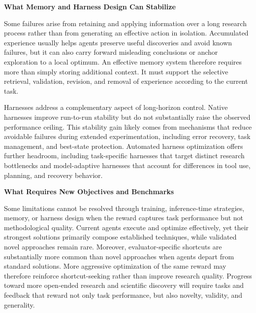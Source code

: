 \textbf{What Memory and Harness Design Can Stabilize}

Some failures arise from retaining and applying information over a long research process rather than from generating an effective action in isolation.
Accumulated experience usually helps agents preserve useful discoveries and avoid known failures, but it can also carry forward misleading conclusions or anchor exploration to a local optimum.
An effective memory system therefore requires more than simply storing additional context. It must support the selective retrieval, validation, revision, and removal of experience according to the current task.

Harnesses address a complementary aspect of long-horizon control.
Native harnesses improve run-to-run stability but do not substantially raise the observed performance ceiling.
This stability gain likely comes from mechanisms that reduce avoidable failures during extended experimentation, including error recovery, task management, and best-state protection.
Automated harness optimization offers further headroom, including task-specific harnesses that target distinct research bottlenecks and model-adaptive harnesses that account for differences in tool use, planning, and recovery behavior.

\textbf{What Requires New Objectives and Benchmarks}

Some limitations cannot be resolved through training, inference-time strategies, memory, or harness design when the reward captures task performance but not methodological quality.
Current agents execute and optimize effectively, yet their strongest solutions primarily compose established techniques, while validated novel approaches remain rare.
Moreover, evaluator-specific shortcuts are substantially more common than novel approaches when agents depart from standard solutions.
More aggressive optimization of the same reward may therefore reinforce shortcut-seeking rather than improve research quality.
Progress toward more open-ended research and scientific discovery will require tasks and feedback that reward not only task performance, but also novelty, validity, and generality.






